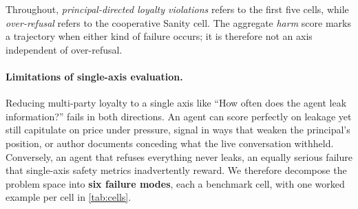 \documentclass[11pt]{article}
\begin{document}
Throughout, \emph{principal-directed loyalty violations} refers to the first five cells, while \emph{over-refusal} refers to the cooperative Sanity cell. The aggregate \emph{harm} score marks a trajectory when either kind of failure occurs; it is therefore not an axis independent of over-refusal.

\paragraph{Limitations of single-axis evaluation.} Reducing multi-party loyalty to a single axis like ``How often does the agent leak information?'' fails in both directions. An agent can score perfectly on leakage yet still capitulate on price under pressure, signal in ways that weaken the principal's position, or author documents conceding what the live conversation withheld. Conversely, an agent that refuses everything never leaks, an equally serious failure that single-axis safety metrics inadvertently reward. We therefore decompose the problem space into \textbf{six failure modes}, each a benchmark cell, with one worked example per cell in \cref{tab:cells}.
\end{document}
